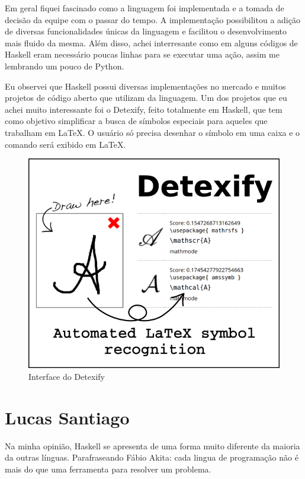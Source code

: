 \documentclass[
  12pt,				         %
  oneside,			       %
  a4paper,			       %
  english,		       	 %
  brazil,			      	 %
]{abntex2}
\begin{document}
\begin{apendicesenv}
        Em geral fiquei fascinado como a linguagem foi implementada e a tomada de decisão da equipe com o passar do tempo. A implementação
        possibilitou a adição de diversas funcionalidades únicas da linguagem e facilitou o desenvolvimento mais fluido da mesma.
        Além disso, achei interresante como em alguns códigos de Haskell eram necessário poucas linhas para se executar uma ação, assim
        me lembrando um pouco de Python.

        Eu observei que Haskell possui diversas implementações no mercado e muitos projetos de código aberto que utilizam da linguagem.
        Um dos projetos que eu achei muito interessante foi o Detexify, feito totalmente em Haskell, que tem como objetivo simplificar a 
        busca de símbolos especiais para aqueles que trabalham em \LaTeX. O usuário só precisa desenhar o símbolo em uma caixa e
        o comando será exibido em \LaTeX.
        
        \begin{figure}[ht]
          \centering
          \includegraphics[scale=0.8]{detexify.png}
          \caption{Interface do Detexify}
        \end{figure}

        \newpage 

        \chapter{Lucas Santiago}

        Na minha opinião, Haskell se apresenta de uma forma muito diferente da maioria da outras línguas. 
        Parafraseando Fábio Akita: cada lingua de programação não é mais do que uma ferramenta
        para resolver um problema.


\end{apendicesenv}
\end{document}
